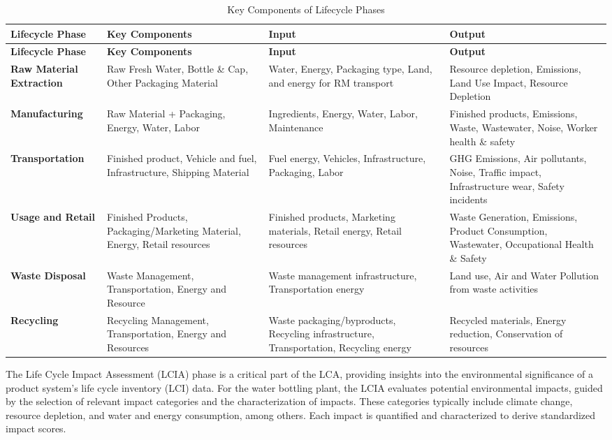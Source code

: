 \documentclass{article}
\begin{document}
\begin{longtable}{p{2.5cm}p{3cm}p{3.5cm}p{3.5cm}}
\caption{Key Components of Lifecycle Phases} \\
\toprule
\textbf{Lifecycle Phase} & \textbf{Key Components} & \textbf{Input} & \textbf{Output} \\
\midrule
\endfirsthead
\toprule
\textbf{Lifecycle Phase} & \textbf{Key Components} & \textbf{Input} & \textbf{Output} \\
\midrule
\endhead
\bottomrule
\endfoot
\bottomrule
\endlastfoot

\textbf{Raw Material Extraction} & 
Raw Fresh Water, Bottle \& Cap, Other Packaging Material & 
Water, Energy, Packaging type, Land, and energy for RM transport & 
Resource depletion, Emissions, Land Use Impact, Resource Depletion \\

\textbf{Manufacturing} & 
Raw Material + Packaging, Energy, Water, Labor & 
Ingredients, Energy, Water, Labor, Maintenance & 
Finished products, Emissions, Waste, Wastewater, Noise, Worker health \& safety \\

\textbf{Transportation} & 
Finished product, Vehicle and fuel, Infrastructure, Shipping Material & 
Fuel energy, Vehicles, Infrastructure, Packaging, Labor & 
GHG Emissions, Air pollutants, Noise, Traffic impact, Infrastructure wear, Safety incidents \\

\textbf{Usage and Retail} & 
Finished Products, Packaging/Marketing Material, Energy, Retail resources & 
Finished products, Marketing materials, Retail energy, Retail resources & 
Waste Generation, Emissions, Product Consumption, Wastewater, Occupational Health \& Safety \\

\textbf{Waste Disposal} & 
Waste Management, Transportation, Energy and Resource & 
Waste management infrastructure, Transportation energy & 
Land use, Air and Water Pollution from waste activities \\

\textbf{Recycling} & 
Recycling Management, Transportation, Energy and Resources & 
Waste packaging/byproducts, Recycling infrastructure, Transportation, Recycling energy & 
Recycled materials, Energy reduction, Conservation of resources \\

\end{longtable}

The Life Cycle Impact Assessment (LCIA) phase is a critical part of the LCA, providing insights into the environmental significance of a product system’s life cycle inventory (LCI) data. For the water bottling plant, the LCIA evaluates potential environmental impacts, guided by the selection of relevant impact categories and the characterization of impacts. These categories typically include climate change, resource depletion, and water and energy consumption, among others. Each impact is quantified and characterized to derive standardized impact scores.
\end{document}
